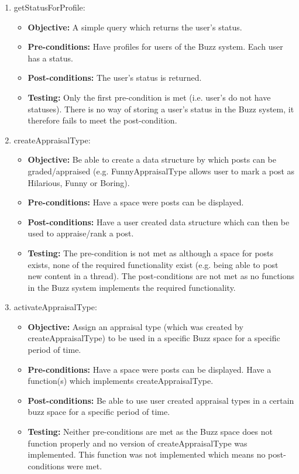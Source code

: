 \begin{enumerate}
\begin{itemize}
	\end{itemize}
\item getStatusForProfile:
	\begin{itemize}
		\item\textbf{Objective: } A simple query which returns the user’s status.
		\item\textbf{Pre-conditions: } Have profiles for users of the Buzz system. Each user has a status.
		\item\textbf{Post-conditions: } The user’s status is returned.
		\item\textbf{Testing: } Only the first pre-condition is met (i.e. user’s do not have statuses). There is no way of storing a user’s status in the Buzz system, it therefore fails to meet the post-condition.
	\end{itemize}
\item createAppraisalType:
	\begin{itemize}
		\item\textbf{Objective: }  Be able to create a data structure by which posts can be graded/appraised (e.g. FunnyAppraisalType allows user to mark a post as Hilarious, Funny or Boring).
		\item\textbf{Pre-conditions: } Have a space were posts can be displayed.
		\item\textbf{Post-conditions: }Have a user created data structure which can then be used to appraise/rank a post.
		\item\textbf{Testing: } The pre-condition is not met as although a space for posts exists, none of the required functionality exist (e.g. being able to post new content in a thread). The post-conditions are not met as no functions in the Buzz system implements the required functionality.
	\end{itemize}
\item activateAppraisalType:
	\begin{itemize}
		\item\textbf{Objective: } Assign an appraisal type (which was created by createAppraisalType) to be used in a specific Buzz space for a specific period of time.
		\item\textbf{Pre-conditions: }  Have a space were posts can be displayed. Have a function(s) which implements createAppraisalType.
		\item\textbf{Post-conditions: }Be able to use user created appraisal types in a certain buzz space for a specific period of time.
		\item\textbf{Testing: }  Neither pre-conditions are met as the Buzz space does not function properly and no version of createAppraisalType was implemented. This function was not implemented which means no post-conditions were met.

\end{itemize}
\end{enumerate}
